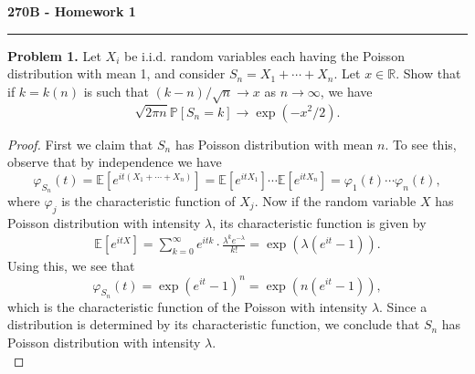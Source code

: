 \documentclass[11pt,letterpaper]{report}
\newcommand{\reals}{\mathbb{R}}
\newcommand{\E}{\mathbb{E}}
\newcommand{\Prob}{\mathbb{P}}
\begin{document}
\begin{center}
{\bf \Large 270B - Homework 1}
\vspace{0.2cm}
\hrule
\end{center}

\noindent\textbf{Problem 1. }Let $X_i$ be i.i.d. random variables each having the Poisson distribution with mean 1, and consider $S_n = X_1 + \cdots + X_n$. Let $x\in \reals$. Show that if $k = k(n)$ is such that $(k-n)/\sqrt{n}\to x$ as $n\to \infty$, we have
\[
\sqrt{2\pi n}\Prob[S_n = k] \to \exp(-x^2/2).
\]
\begin{proof}
	First we claim that $S_n$ has Poisson distribution with mean $n$. To see this, observe that by independence we have
	\begin{equation}\label{chfsum}
		\varphi_{S_n}(t) = \E\left[e^{it(X_1 + \cdots + X_n)}\right] = \E\left[e^{itX_1}\right]\cdots \E\left[e^{itX_n}\right] = \varphi_1(t)\cdots \varphi_n(t),
	\end{equation}
	where $\varphi_j$ is the characteristic function of $X_j$. Now if the random variable $X$ has Poisson distribution with intensity $\lambda$, its characteristic function is given by
	\begin{align*}
		\E\left[e^{itX}\right] = \sum_{k=0}^\infty e^{itk}\cdot \frac{\lambda^ke^{-\lambda}}{k!} = \exp(\lambda(e^{it}-1)).
	\end{align*}
	Using this, we see that
	\[
	\varphi_{S_n}(t) = \exp(e^{it}-1)^n = \exp(n(e^{it} - 1)),
	\]
	which is the characteristic function of the Poisson with intensity $\lambda$. Since a distribution is determined by its characteristic function, we conclude that $S_n$ has Poisson distribution with intensity $\lambda$.\\


\end{proof}
\end{document}
